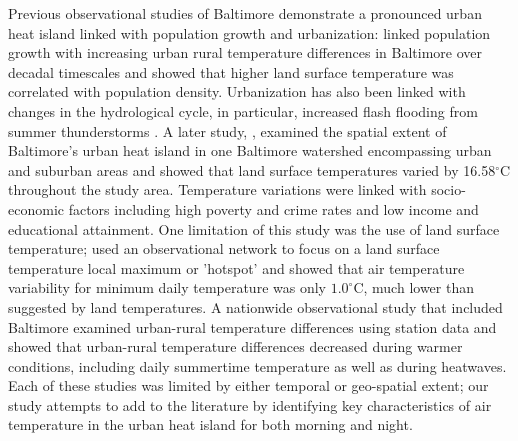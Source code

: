 Previous observational studies of Baltimore demonstrate a pronounced urban heat island linked with population growth and urbanization: \cite{brazel2000tale} linked population growth with increasing urban rural temperature differences in Baltimore over decadal timescales and showed that higher land surface temperature was correlated with population density. 
Urbanization has also been linked with changes in the hydrological cycle, in particular,    %
increased flash flooding from summer thunderstorms \citep{ntelekos2007climatological}.   
 A later study,
\cite{Huang20111753}, examined the spatial extent of Baltimore's urban heat island in one Baltimore watershed encompassing urban and suburban areas and showed that land surface temperatures varied by 16.58$^\circ$C throughout the study area. Temperature variations were linked with socio-economic factors including high poverty and crime rates and low income and educational attainment. One limitation of this study was the use of land surface temperature; \cite{scott2017intraurban} used an observational network to focus on a land surface temperature local maximum or 'hotspot' and showed that air temperature variability for minimum daily temperature was only $1.0^\circ$C, much lower than suggested by land temperatures. 
A nationwide observational study that included Baltimore \citep{scott2018reduced} examined urban-rural temperature differences using station data and showed that urban-rural temperature differences decreased during warmer conditions, including daily summertime temperature as well as during heatwaves.  Each of these studies was limited by either temporal or geo-spatial extent; our study attempts to add to the literature by identifying key characteristics of air temperature in the urban heat island for both morning and night. 

